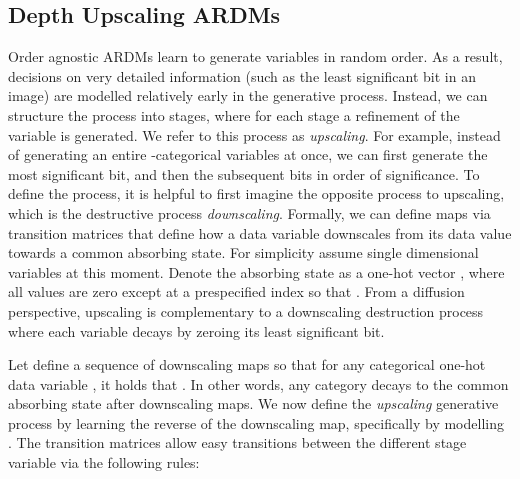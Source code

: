 \documentclass{article} \usepackage{iclr2022_conference,times}
\begin{document}
\subsection{Depth Upscaling ARDMs}
Order agnostic ARDMs learn to generate variables in random order. As a result, decisions on very detailed information (such as the least significant bit in an image) are modelled relatively early in the generative process. Instead, we can structure the process into stages, where for each stage a refinement of the variable is generated. We refer to this process as \textit{upscaling}. For example, instead of generating an entire -categorical variables at once, we can first generate the most significant bit, and then the subsequent bits in order of significance. To define the process, it is helpful to first imagine the opposite process to upscaling, which is the destructive process \textit{downscaling}. Formally, we can define maps via transition matrices  that define how a data variable downscales from its data value towards a common absorbing state. For simplicity assume single dimensional variables at this moment. Denote the absorbing state as a one-hot vector , where all values are zero except at a prespecified index  so that . From a diffusion perspective, upscaling is complementary to a downscaling destruction process where each variable decays by zeroing its least significant bit.

Let  define a sequence of downscaling maps so that for any categorical one-hot data variable , it holds that . In other words, any category  decays to the common absorbing state after  downscaling maps. We now define the \textit{upscaling} generative process by learning the reverse of the downscaling map, specifically by modelling . The transition matrices allow easy transitions between the different stage variable  via the following rules:
\end{document}
